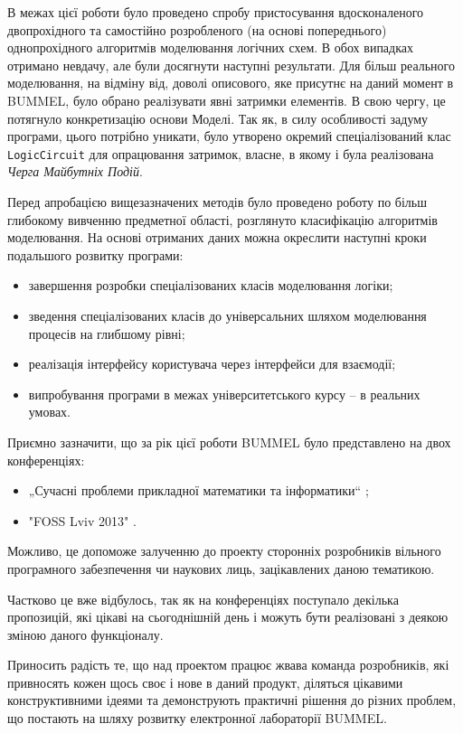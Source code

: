 \documentclass[12pt,a4paper]{article}
\begin{document}
В межах цієї роботи було проведено спробу пристосування вдосконаленого двопрохідного та самостійно розробленого (на основі попереднього) однопрохідного алгоритмів моделювання логічних схем. В обох випадках отримано невдачу, але були досягнути наступні результати. Для більш реального моделювання, на відміну від, доволі описового, яке присутнє на даний момент в BUMMEL, було обрано реалізувати явні затримки елементів. В свою чергу, це потягнуло конкретизацію основи Моделі. Так як, в силу особливості задуму програми, цього потрібно уникати, було утворено окремий спеціалізований клас \lstinline$LogicCircuit$ для опрацювання затримок, власне, в якому і була реалізована \emph{Черга Майбутніх Подій}.

Перед апробацією вищезазначених методів було проведено роботу по більш глибокому вивченню предметної області, розглянуто класифікацію алгоритмів моделювання. На основі отриманих даних можна окреслити наступні кроки подальшого розвитку програми:
\begin{itemize}
  \item завершення розробки спеціалізованих класів моделювання логіки;
  \item зведення спеціалізованих класів до універсальних шляхом моделювання процесів на глибшому рівні;
  \item реалізація інтерфейсу користувача через інтерфейси для взаємодії;
  \item випробування програми в межах університетського курсу -- в реальних умовах.
\end{itemize}

Приємно зазначити, що за рік цієї роботи BUMMEL було представлено на двох конференціях:
\begin{itemize}
  \item „Сучасні проблеми прикладної математики та інформатики“ \cite{thesis-MPoAMaCS};
  \item "FOSS Lviv 2013" \cite{thesis-foss2013}.
\end{itemize}
Можливо, це допоможе залученню до проекту сторонніх розробників вільного програмного забезпечення чи наукових лиць, зацікавлених даною тематикою.

Частково це вже відбулось, так як на конференціях поступало декілька пропозицій, які цікаві на сьогоднішній день і можуть бути реалізовані з деякою зміною даного функціоналу.

Приносить радість те, що над проектом працює жвава команда розробників, які привносять кожен щось своє і нове в даний продукт, діляться цікавими конструктивними ідеями та демонструють практичні рішення до різних проблем, що постають на шляху розвитку електронної лабораторії BUMMEL.
\end{document}
